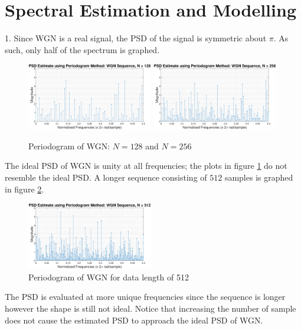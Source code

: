 \documentclass{article}
\begin{document}
\newpage
\section{Spectral Estimation and Modelling}

1. Since WGN is a real signal, the PSD of the signal is symmetric about $\pi$. As such, only half of the spectrum is graphed.

\begin{figure}[H]
    \centering
    \includegraphics[width=0.49\textwidth]{pgm_wgn_128}
    \includegraphics[width=0.49\textwidth]{pgm_wgn_256}
    \caption{Periodogram of WGN: $N=128$ and $N=256$}
    \label{fig:pgm_wgn_1}
\end{figure}

The ideal PSD of WGN is unity at all frequencies; the plots in figure \ref{fig:pgm_wgn_1} do not resemble the ideal PSD. A longer sequence consisting of $512$ samples is graphed in figure \ref{fig:pgm_wgn_2}.

\begin{figure}[H]
    \centering
    \includegraphics[width=0.49\textwidth]{pgm_wgn_512}
    \caption{Periodogram of WGN for data length of 512}
    \label{fig:pgm_wgn_2}
\end{figure}

The PSD is evaluated at more unique frequencies since the sequence is longer however the shape is still not ideal. Notice that increasing the number of sample does not cause the estimated PSD to approach the ideal PSD of WGN.\\
\end{document}
